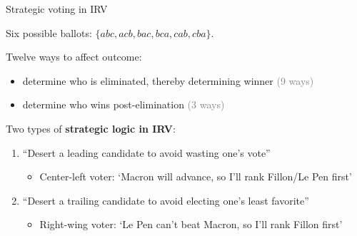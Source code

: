 \documentclass[10pt, en-GB]{beamer}
\begin{document}
\begin{frame}{Strategic voting in IRV} 

Six possible ballots: $\{abc, acb, bac, bca, cab, cba\}$. \\ \bigskip \pause 

Twelve ways to affect outcome: 

\begin{itemize}
\item determine who is eliminated, thereby determining winner \textcolor{gray}{(9 ways)}
\item determine who wins post-elimination \textcolor{gray}{(3 ways)} 
\end{itemize} 

\pause \bigskip 

Two types of \textbf{strategic logic in IRV}: 
\begin{enumerate} 
\item ``Desert a leading candidate to avoid wasting one's vote''
	\begin{itemize}
		\item Center-left voter: `Macron will advance, so I'll rank Fillon/Le Pen first'
	\end{itemize}     \pause 
\item ``Desert a trailing candidate to avoid electing one's least favorite''
	\begin{itemize}
		\item Right-wing voter: `Le Pen can't beat Macron, so I'll rank Fillon first'
	\end{itemize} 
\end{enumerate} 

\end{frame} 
\end{document}
